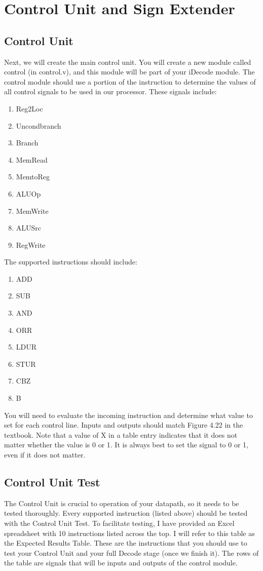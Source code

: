 \chapter{Control Unit and Sign Extender}

\section{Control Unit}
Next, we will create the main control unit.  You will create a new module called control (in control.v), and this module will be part of your iDecode module.  The control module should use a portion of the instruction to determine the values of all control signals to be used in our processor.  These signals include:
\begin{enumerate}
\item Reg2Loc
\item Uncondbranch
\item Branch
\item MemRead
\item MemtoReg
\item ALUOp
\item MemWrite
\item ALUSrc
\item RegWrite
\end{enumerate}

The supported instructions should include:
\begin{enumerate}
	\item ADD
	\item SUB
	\item AND
	\item ORR
	\item LDUR
	\item STUR
	\item CBZ
	\item B
\end{enumerate}

You will need to evaluate the incoming instruction and determine what value to set for each control line.  Inputs and outputs should match Figure 4.22 in the textbook.  Note that a value of X in a table entry indicates that it does not matter whether the value is 0 or 1.  It is always best to set the signal to 0 or 1, even if it does not matter.

\section{Control Unit Test}
The Control Unit is crucial to operation of your datapath, so it needs to be tested thoroughly.  Every supported instruction (listed above) should be tested with the Control Unit Test.  To facilitate testing, I have provided an Excel spreadsheet with 10 instructions listed across the top.  I will refer to this table as the Expected Results Table.  These are the instructions that you should use to test your Control Unit and your full Decode stage (once we finish it).  The rows of the table are signals that will be inputs and outputs of the control module.  

